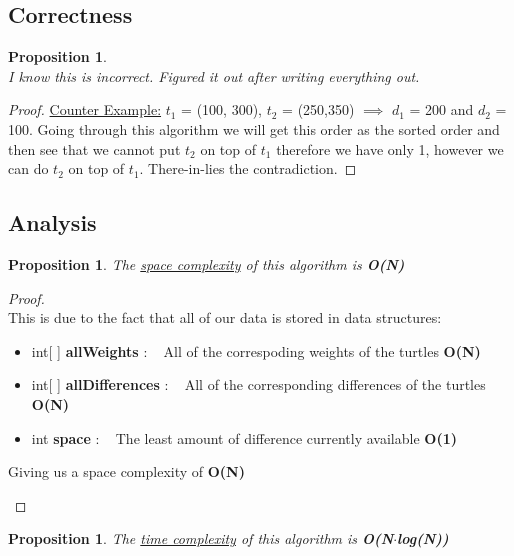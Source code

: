 \documentclass[12pt]{article}
\newtheorem{proposition}[theorem]{Proposition}
\begin{document}

\subsection{Correctness}
\begin{proposition}
~ \\ \indent I know this is incorrect. Figured it out after writing everything
out.
\end{proposition}


\begin{proof}
\underline{Counter Example:} $t_1$ = (100, 300), $t_2$ = (250,350) $\implies$
$d_1$ = 200 and $d_2$ = 100. Going through this algorithm we will get this order
as the sorted order and then see that we cannot put $t_2$ on top of $t_1$ therefore
we have only 1, however we can do $t_2$ on top of $t_1$. There-in-lies the
contradiction.
\end{proof}


\subsection{Analysis}
\begin{proposition}
\label{numq}
The \underline{space complexity} of this algorithm is \textbf{O(N)}
\end{proposition}

\begin{proof}
~ \\ \indent This is due to the fact that all of our data is stored in data structures:
\begin{itemize}
    \item int[ ] \textbf{allWeights} : ~ All of the correspoding weights of the turtles \textbf{O(N)}
    \item int[ ] \textbf{allDifferences} : ~ All of the corresponding differences of the turtles \textbf{O(N)}
    \item int \textbf{space} : ~ The least amount of difference currently available \textbf{O(1)}
\end{itemize}
\begin{center}
    Giving us a space complexity of \textbf{O(N)}
\end{center}
\end{proof}

\begin{proposition}
\label{numq}
The \underline{time complexity} of this algorithm is \textbf{O(N$\cdot$log(N))}
\end{proposition}
\end{document}
